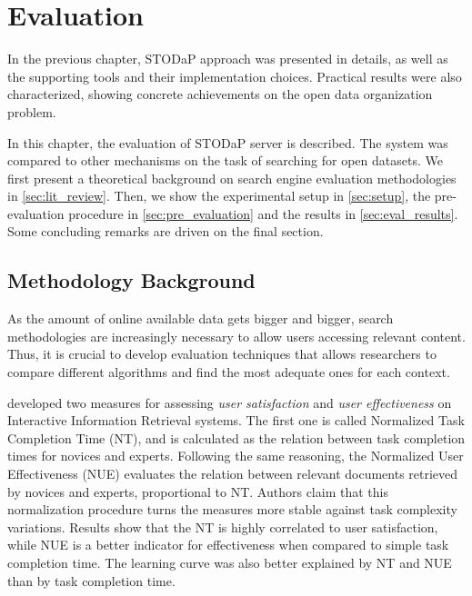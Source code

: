 \chapter{Evaluation}
\label{chap:evaluation}

In the previous chapter, STODaP approach was presented in details, as well as the supporting tools and their implementation choices.
Practical results were also characterized, showing concrete achievements on the open data organization problem.

In this chapter, the evaluation of STODaP server is described.
The system was compared to other mechanisms on the task of searching for open datasets.
We first present a theoretical background on search engine evaluation methodologies in \autoref{sec:lit_review}.
Then, we show the experimental setup in \autoref{sec:setup}, the pre-evaluation procedure in \autoref{sec:pre_evaluation} and the results in \autoref{sec:eval_results}.
Some concluding remarks are driven on the final section.

\section{Methodology Background}
\label{sec:lit_review}

As the amount of online available data gets bigger and bigger, search methodologies are increasingly necessary to allow users accessing relevant content.
Thus, it is crucial to develop evaluation techniques that allows researchers to compare different algorithms and find the most adequate ones for each context.

 developed two measures for assessing \emph{user satisfaction} and \emph{user effectiveness} on Interactive Information Retrieval systems.
The first one is called Normalized Task Completion Time (NT), and is calculated as the relation between task completion times for novices and experts.
Following the same reasoning, the Normalized User Effectiveness (NUE) evaluates the relation between relevant documents retrieved by novices and experts, proportional to NT.
Authors claim that this normalization procedure turns the measures more stable against task complexity variations.
Results show that the NT is highly correlated to user satisfaction, while NUE is a better indicator for effectiveness when compared to simple task completion time.
The learning curve was also better explained by NT and NUE than by task completion time.


